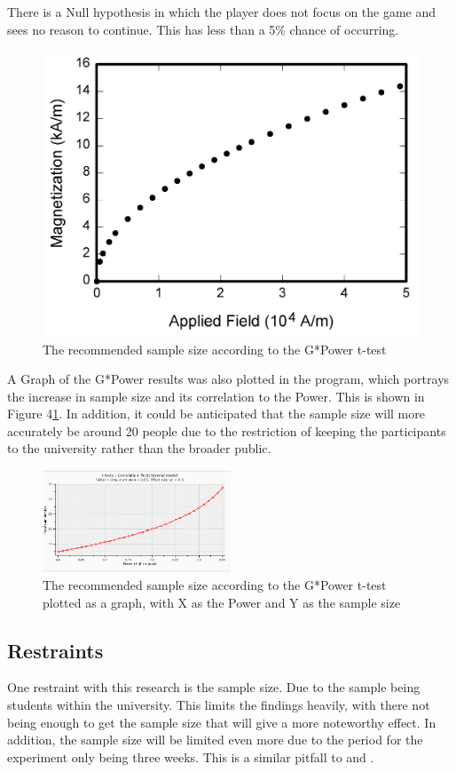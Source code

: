 \documentclass[conference]{IEEEtran}
\begin{document}
There is a Null hypothesis in which the player does not focus on the game and sees no reason to continue. This has less than a 5\% chance of occurring. 
\begin{figure}[H]
\includegraphics[width =0.5 \textwidth]{fig1}
\caption{The recommended sample size according to the G*Power t-test}
\label{tab:figure4}
\end{figure}

A Graph of the G*Power results was also plotted in the program, which portrays the increase in sample size and its correlation to the Power. This is shown in Figure 4\ref{tab:figure4}. In addition, it could be anticipated that the sample size will more accurately be around 20 people due to the restriction of keeping the participants to the university rather than the broader public. 

\begin{figure}[H]
\includegraphics[width = 0.5\textwidth]{fig2}
\caption{The recommended sample size according to the G*Power t-test plotted as a graph, with X as the Power and Y as the sample size}
\label{tab:figure5}
\end{figure}

\subsection {Restraints}
One restraint with this research is the sample size. Due to the sample being students within the university. This limits the findings heavily, with there not being enough to get the sample size that will give a more noteworthy effect. In addition, the sample size will be limited even more due to the period for the experiment only being three weeks. This is a similar pitfall to \cite{Naaj2021} and \cite{Ruqeyya2022}.\\
\end{document}

